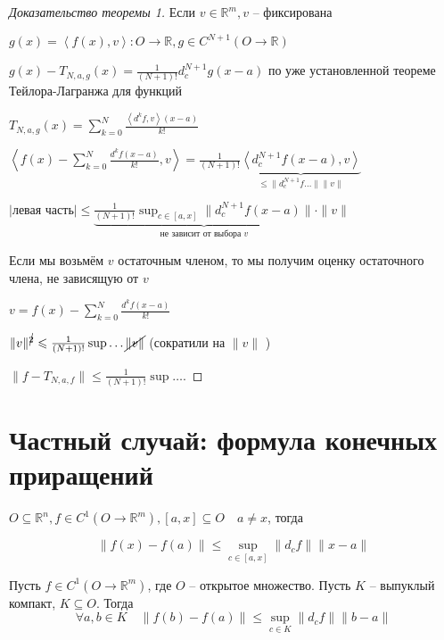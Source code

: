 \documentclass{book}
\newcommand\R{\ensuremath{\mathbb{R}}}
\newcommand\Z{\ensuremath{\mathbb{Z}}}
\theoremstyle{definition}
\begin{document}
     \begin{proof}
         [Доказательство теоремы 1]
         Если $v\in \R^m, v$ -- фиксирована

         $g(x) = \left<f(x), v \right>:O \to \R, g\in C^{N+1}\left( O\to \R \right) $

         $g(x)-T_{N,a,g}(x) = \frac{1}{(N+1)!}d_c^{N+1}g(x-a)$ по уже установленной теореме Тейлора-Лагранжа для функций
\def \mulinl {\substack{\alpha\in \left( \Z _+ \right) ^n \\ |\alpha|\leqslant N}}
\def \muline {\substack{\alpha\in \left( \Z _+ \right) ^n \\ |\alpha|\neq  N}}

$T_{N, a, g}(x) = \sum_{k=0}^{N} \frac{\left<d^kf, v \right>(x-a)}{k!}$

$\left<f(x) - \sum_{k=0}^{N} \frac{d^kf(x-a)}{k!}, v \right> = \frac{1}{(N+1)!}\underbrace{\left<d_c^{N+1}f(x-a), v \right>}_{\leqslant \|d_c^{N+1} f \ldots\|\|v\|}$ 

$\left| \text{левая часть} \right| \leqslant\underbrace{ \frac{1}{(N+1)!}\sup_{c\in [a,x]} \|d_c^{N+1}f(x-a)\|}_{\text{не зависит от выбора $v$}} \cdot  \|v\|$

Если мы возьмём $v$ остаточным членом, то мы получим оценку остаточного члена, не зависящую от  $v$

$v = f(x) - \sum_{k=0}^{N} \frac{d^kf(x-a)}{k!}$ 

$\|v\|^{\cancel{2}} \leqslant \frac{1}{(N+1)!}\sup \ldots \cancel{\|v\|}$  (сократили на $\|v\|$ )

$\|f - T_{N, a, f}\| \leqslant  \frac{1}{(N+1)!}\sup \ldots.$
     \end{proof}

     \section{Частный случай: формула конечных приращений}

     $O\subseteq \R^n, f\in C^1\left(O\to \R^m  \right) , [a,x]\subseteq O \quad a\neq x$, тогда 

     \[\|f(x) - f(a)\|\leqslant \sup_{c\in [a,x]} \|d_c f\| \|x-a\|\]


     \begin{corollary}
         Пусть $f\in C^1\left( O \to \R^m \right) $, где $O$ -- открытое множество.
         Пусть  $K$ -- выпуклый компакт,  $K\subseteq O$.
         Тогда \[\forall a, b\in K\quad \|f(b)-f(a)\| \leqslant \sup\limits_{c\in K}\|d_cf\| \|b-a\| \]
     \end{corollary}
\end{document}
